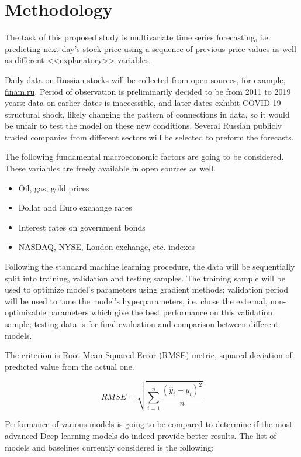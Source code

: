\documentclass{elsarticle}
\begin{document}
\section{Methodology}

The task of this proposed study is multivariate time series forecasting, i.e. predicting next day's stock price using a sequence of previous price values as well as different <<explanatory>> variables.

Daily data on Russian stocks will be collected from open sources, for example, \url{finam.ru}. Period of observation is preliminarily decided to be from 2011 to 2019 years: data on earlier dates is inaccessible, and later dates exhibit COVID-19 structural shock, likely changing the pattern of connections in data, so it would be unfair to test the model on these new conditions.
Several Russian publicly traded companies from different sectors will be selected to preform the forecasts.

The following fundamental macroeconomic factors are going to be considered. These variables are freely available in open sources as well.

\begin{itemize}
	\item Oil, gas, gold prices
	\item Dollar and Euro exchange rates
	\item Interest rates on government bonds
	\item NASDAQ, NYSE, London exchange, etc. indexes
\end{itemize}

Following the standard machine learning procedure, the data will be sequentially split into training, validation and testing samples. The training sample will be used to optimize model's parameters using gradient methods; validation period will be used to tune the model's hyperparameters, i.e. chose the external, non-optimizable parameters which give the best performance on this validation sample; testing data is for final evaluation and comparison between different models.

The criterion is Root Mean Squared Error (RMSE) metric, squared deviation of predicted value from the actual one.

\begin{equation}
RMSE = \sqrt{\sum_{i=1}^{n} \frac{(\hat{y}_i - y_i)^2}{n}}
\end{equation}

Performance of various models is going to be compared to determine if the most advanced Deep learning models do indeed provide better results. The list of models and baselines currently considered is the following:
\end{document}
